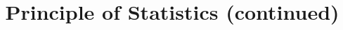 \documentclass[a4paper]{article}
\begin{document}
\title{Principle of Statistics (continued) }

\maketitle

\newpage

\tableofcontents

\newpage
\end{document}
